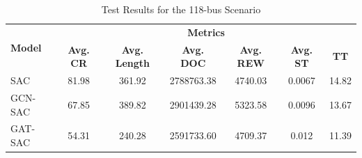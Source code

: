 \begin{table}[h!]
	\centering
	\caption{Test Results for the 118-bus Scenario}
	\begin{tabular}{lcccccc}
		\toprule
		\multirow{2}{*}{\textbf{Model}} & \multicolumn{6}{c}{\textbf{Metrics}} \\ 
		\cmidrule(lr){2-7}
		&  \textbf{Avg. CR} & \textbf{Avg. Length} & \textbf{Avg. DOC} & \textbf{Avg. REW} & \textbf{Avg. ST} & \textbf{TT} \\ 
		\midrule
		SAC & 81.98 & 361.92 & 2788763.38 & 4740.03 & 0.0067 & 14.82 \\
		GCN-SAC & 67.85 & 389.82 & 2901439.28 & 5323.58 & 0.0096 & 13.67 \\
		GAT-SAC & 54.31 & 240.28 & 2591733.60 & 4709.37 & 0.012 & 11.39 \\
		\bottomrule
	\end{tabular}
	\label{tab:test-118}
\end{table}